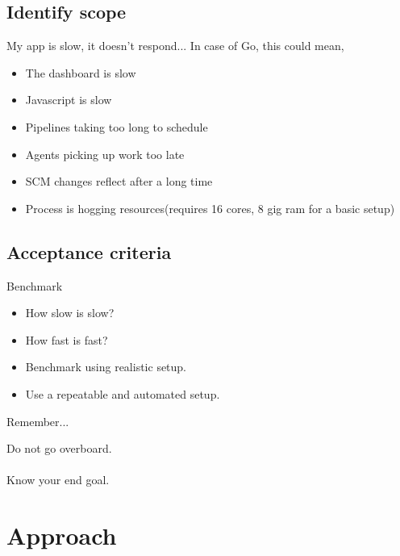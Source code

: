 \documentclass{beamer}
\begin{document}
\subsection{Identify scope}

\begin{frame}{My app is slow, it doesn't respond...}
  In case of Go, this could mean,
  \begin{itemize}
  \item The dashboard is slow
    \pause
  \item Javascript is slow
    \pause
  \item Pipelines taking too long to schedule
    \pause
  \item Agents picking up work too late
    \pause
  \item SCM changes reflect after a long time
    \pause
  \item Process is hogging resources(requires 16 cores, 8 gig ram for a basic setup)
  \end{itemize}
\end{frame}

\subsection{Acceptance criteria}

\begin{frame}{Benchmark}
  \begin{itemize}
  \item How slow is slow?
    \pause
  \item How fast is fast?
    \pause
  \item Benchmark using realistic setup.
    \pause
  \item Use a repeatable and automated setup.
  \end{itemize}
\end{frame}

\begin{frame}{Remember...}
  \begin{center}
    \large{Do not go overboard.}\quad\\
    \quad\\
    \small{Know your end goal.}
  \end{center}
\end{frame}

\section{Approach}
\end{document}

